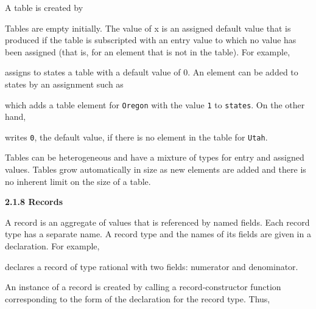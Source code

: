 A table is created by




Tables are empty initially. The value of x is an assigned default
value that is produced if the table is subscripted with an entry value
to which no value has been assigned (that is, for an element that is
not in the table). For example,



\noindent assigns to states a table with a default value of 0. An
element can be added to states by an assignment such as



\noindent which adds a table element for
\texttt{{\textquotedbl}Oregon{\textquotedbl}} with the value
\texttt{1} to \texttt{states}. On the other hand,



\noindent writes \texttt{0}, the default value, if there is no element
in the table for \texttt{{\textquotedbl}Utah{\textquotedbl}}.

Tables can be heterogeneous and have a mixture of types for entry and
assigned values. Tables grow automatically in size as new elements are
added and there is no inherent limit on the size of a table.

{\sffamily\bfseries
2.1.8 Records}

A record is an aggregate of values that is referenced by named
fields. Each record type has a separate name. A record type and the
names of its fields are given in a declaration. For example,



\noindent
declares a record of type rational with two fields: numerator and denominator.

An instance of a record is created by calling a record-constructor
function corresponding to the form of the declaration for the record
type. Thus,



